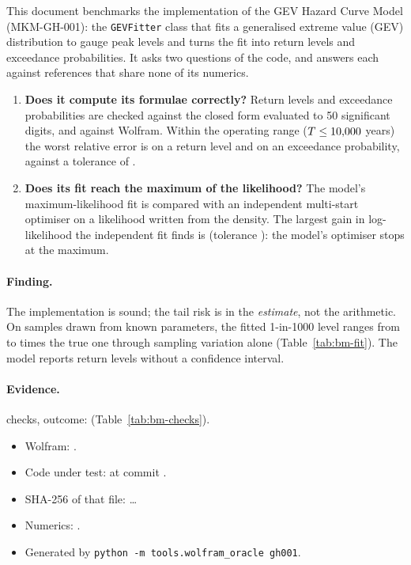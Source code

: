 \documentclass[11pt,a4paper]{article}
\begin{document}
\mkmtitlepage
\mkmlegalpage

\tableofcontents
\clearpage

\mkmexecsummary

This document benchmarks the implementation of the GEV Hazard Curve Model
(MKM-GH-001): the \texttt{GEVFitter} class that fits a generalised extreme value
(GEV) distribution to gauge peak levels and turns the fit into return levels and
exceedance probabilities. It asks two questions of the code, and answers each
against references that share none of its numerics.

\begin{enumerate}[leftmargin=*]
\item \textbf{Does it compute its formulae correctly?} Return levels and
  exceedance probabilities are checked against the closed form evaluated to 50
  significant digits, and against Wolfram. Within the operating range
  ($T \le 10{,}000$ years) the worst relative error is \bmWorstLevel{} on a
  return level and \bmWorstExc{} on an exceedance probability, against a
  tolerance of \bmTol. \bmWolframConfirms
\item \textbf{Does its fit reach the maximum of the likelihood?} The model's
  maximum-likelihood fit is compared with an independent multi-start optimiser
  on a likelihood written from the density. The largest gain in log-likelihood
  the independent fit finds is \bmLLGain{} (tolerance \bmLLTol): the model's
  optimiser stops at the maximum.
\end{enumerate}

\paragraph{Finding.} The implementation is sound; the tail risk is in the
\emph{estimate}, not the arithmetic. On samples drawn from known parameters, the
fitted 1-in-1000 level ranges from \bmRatioMin{} to \bmRatioMax{} times the true
one through sampling variation alone (Table~\ref{tab:bm-fit}). The model reports
return levels without a confidence interval.

\paragraph{Evidence.} \bmChecks{} checks, outcome: \bmOutcome{}
(Table~\ref{tab:bm-checks}).
\begin{itemize}[leftmargin=*,nosep]
\item Wolfram: \bmWolfram{}\bmWolframVia.
\item Code under test: \bmCodeFile{} at commit \bmCodeCommit{}\bmCodeDirty.
\item SHA-256 of that file: \bmCodeSha{}\ldots
\item Numerics: \bmNumerics.
\item Generated \bmGenerated{} by \texttt{python -m tools.wolfram\_oracle gh001}.
\end{itemize}
\end{document}
